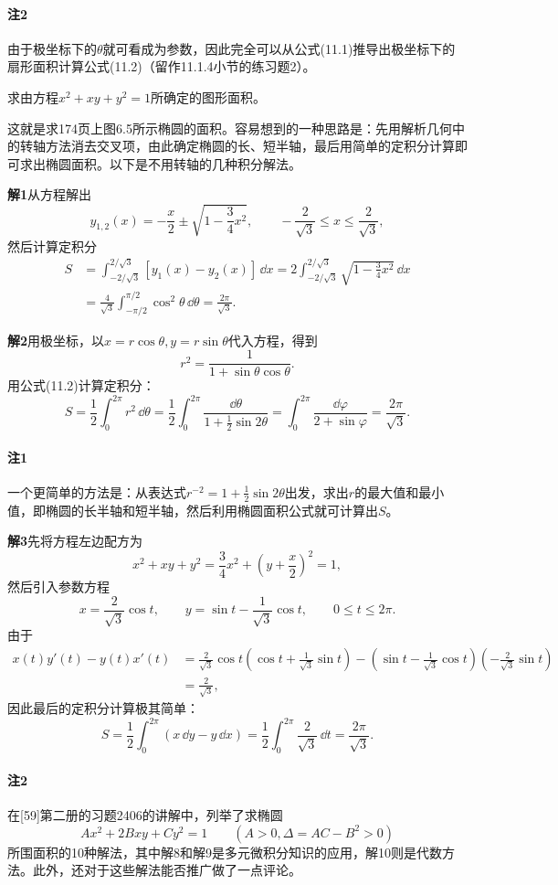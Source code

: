 \paragraph{注2} 由于极坐标下的$\theta$就可看成为参数，因此完全可以从公式(11.1)推导出极坐标下的扇形面积计算公式(11.2)（留作11.1.4小节的练习题2）。

\begin{xexample}[11.1.1]
求由方程$x^2+xy+y^2=1$所确定的图形面积。
\end{xexample}
\begin{xsolution}
这就是求174页上图6.5所示椭圆的面积。容易想到的一种思路是：先用解析几何中的转轴方法消去交叉项，由此确定椭圆的长、短半轴，最后用简单的定积分计算即可求出椭圆面积。以下是不用转轴的几种积分解法。

\textbf{解1}\quad 从方程解出
\[
  y_{1,2}(x)=-\frac{x}{2}\pm\sqrt{1-\frac34x^2},\qquad
  -\frac{2}{\sqrt3}\le x\le\frac{2}{\sqrt3},
\]
然后计算定积分
\begin{align*}
S&=\int_{-2/\sqrt3}^{2/\sqrt3}[y_1(x)-y_2(x)]\,\dd x
 =2\int_{-2/\sqrt3}^{2/\sqrt3}\sqrt{1-\frac34x^2}\,\dd x\\
 &=\frac4{\sqrt3}\int_{-\pi/2}^{\pi/2}\cos^2\theta\,\dd\theta
 =\frac{2\pi}{\sqrt3}.
\end{align*}

\textbf{解2}\quad 用极坐标，以$x=r\cos\theta,y=r\sin\theta$代入方程，得到
\[
  r^2=\frac1{1+\sin\theta\cos\theta}.
\]
用公式(11.2)计算定积分：
\[
  S=\frac12\int_0^{2\pi}r^2\,\dd\theta
  =\frac12\int_0^{2\pi}\frac{\dd\theta}{1+\frac12\sin2\theta}
  =\int_0^{2\pi}\frac{\dd\varphi}{2+\sin\varphi}
  =\frac{2\pi}{\sqrt3}.
\]
\paragraph{注1} 一个更简单的方法是：从表达式$r^{-2}=1+\frac12\sin2\theta$出发，求出$r$的最大值和最小值，即椭圆的长半轴和短半轴，然后利用椭圆面积公式就可计算出$S$。

\textbf{解3}\quad 先将方程左边配方为
\[
  x^2+xy+y^2=\frac34x^2+\left(y+\frac{x}{2}\right)^2=1,
\]
然后引入参数方程
\[
  x=\frac2{\sqrt3}\cos t,\qquad
  y=\sin t-\frac1{\sqrt3}\cos t,\qquad 0\le t\le2\pi.
\]
由于
\begin{align*}
x(t)y'(t)-y(t)x'(t)
&=\frac2{\sqrt3}\cos t\left(\cos t+\frac1{\sqrt3}\sin t\right)
 -\left(\sin t-\frac1{\sqrt3}\cos t\right)\left(-\frac2{\sqrt3}\sin t\right)\\
&=\frac2{\sqrt3},
\end{align*}
因此最后的定积分计算极其简单：
\[
  S=\frac12\int_0^{2\pi}(x\,\dd y-y\,\dd x)
  =\frac12\int_0^{2\pi}\frac2{\sqrt3}\,\dd t
  =\frac{2\pi}{\sqrt3}.
\]
\paragraph{注2} 在[59]第二册的习题2406的讲解中，列举了求椭圆
\[
  Ax^2+2Bxy+Cy^2=1\qquad(A>0,\Delta=AC-B^2>0)
\]
所围面积的10种解法，其中解8和解9是多元微积分知识的应用，解10则是代数方法。此外，还对于这些解法能否推广做了一点评论。
\end{xsolution}

